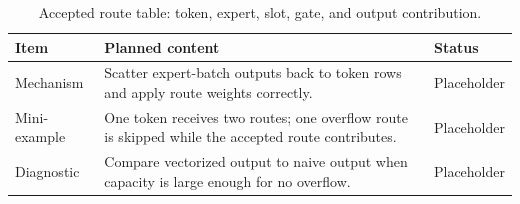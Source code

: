 \begin{table}[H]
\centering
\caption{Accepted route table: token, expert, slot, gate, and output contribution.}
\label{tab:ch06-unpacking-and-weighted-combine}
\begin{tabularx}{\textwidth}{p{}X p{}}
\toprule
Item & Planned content & Status \\
\midrule
Mechanism & Scatter expert-batch outputs back to token rows and apply route weights correctly. & Placeholder \\
Mini-example & One token receives two routes; one overflow route is skipped while the accepted route contributes. & Placeholder \\
Diagnostic & Compare vectorized output to naive output when capacity is large enough for no overflow. & Placeholder \\
\bottomrule
\end{tabularx}
\end{table}
